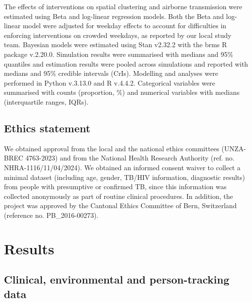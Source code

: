 \documentclass[11pt]{article}
\begin{document}
The effects of interventions on spatial clustering and airborne transmission were estimated using Beta and log-linear regression models.  Both the Beta and log-linear model were adjusted for weekday effects to account for difficulties in enforcing interventions on crowded weekdays, as reported by our local study team. Bayesian models were estimated using Stan v2.32.2 with the brms R package v.2.20.0. Simulation results were summarised with medians and 95\% quantiles and estimation results were pooled across simulations and reported with medians and 95\% credible intervals (CrIs). Modelling and analyses were performed in Python v.3.13.0 and R v.4.4.2. Categorical variables were summarised with counts (proportion, \%) and numerical variables with medians (interquartile ranges, IQRs).

\subsection{Ethics statement}\label{ethics-statement}

We obtained approval from the local and the national ethics committees (UNZA-BREC 4763-2023) and from the National Health Research Authority (ref. no. NHRA-1116/11/04/2024). We obtained an informed consent waiver to collect a minimal dataset (including age, gender, TB/HIV information, diagnostic results) from people with presumptive or confirmed TB, since this information was collected anonymously as part of routine clinical procedures. In addition, the project was approved by the Cantonal Ethics Committee of Bern, Switzerland (reference no. PB\_2016-00273).

\section{Results}\label{results}

\subsection{Clinical, environmental and person-tracking data}\label{clinical-environmental-and-person-tracking-data}
\end{document}
